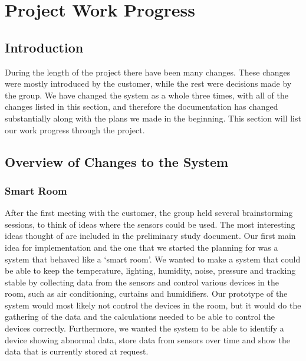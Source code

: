 \documentclass[../document.tex]{subfiles}
\begin{document}
\section{Project Work Progress}

\subsection{Introduction}
During the length of the project there have been many changes. These changes were mostly introduced by the customer, while the rest were decisions made by the group. We have changed the system as a whole three times, with all of the changes listed in this section, and therefore the documentation has changed substantially along with the plans we made in the beginning. This section will list our work progress through the project.

\subsection{Overview of Changes to the System}
\subsubsection{Smart Room}
After the first meeting with the customer, the group held several brainstorming sessions, to think of ideas where the sensors could be used. The most interesting ideas thought of are included in the preliminary study document. Our first main idea for implementation and the one that we started the planning for was a system that behaved like a ‘smart room’. We wanted to make a system that could be able to keep the temperature, lighting, humidity, noise, pressure and tracking stable by collecting data from the sensors and control various devices in the room, such as air conditioning, curtains and humidifiers. Our prototype of the system would most likely not control the devices in the room, but it would do the gathering of the data and the calculations needed to be able to control the devices correctly. Furthermore, we wanted the system to be able to identify a device showing abnormal data, store data from sensors over time and show the data that is currently stored at request.
\end{document}
